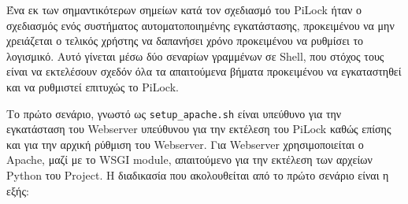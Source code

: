 \label{ch:pilock_configuration}
Ένα εκ των σημαντικότερων σημείων κατά τον σχεδιασμό του PiLock ήταν ο σχεδιασμός ενός συστήματος αυτοματοποιημένης εγκατάστασης, προκειμένου να μην χρειάζεται ο τελικός χρήστης να δαπανήσει χρόνο προκειμένου να ρυθμίσει το λογισμικό. Αυτό γίνεται μέσω δύο σεναρίων γραμμένων σε Shell, που στόχος τους είναι να εκτελέσουν σχεδόν όλα τα απαιτούμενα βήματα προκειμένου να εγκαταστηθεί και να ρυθμιστεί επιτυχώς το PiLock.

Το πρώτο σενάριο, γνωστό ως \verb|setup_apache.sh| είναι υπεύθυνο για την εγκατάσταση του Webserver υπεύθυνου για την εκτέλεση του PiLock καθώς επίσης και για την αρχική ρύθμιση του Webserver. Για Webserver χρησιμοποιείται ο Apache, μαζί με το WSGI module, απαιτούμενο για την εκτέλεση των αρχείων Python του Project. Η διαδικασία που ακολουθείται από το πρώτο σενάριο είναι η εξής:

